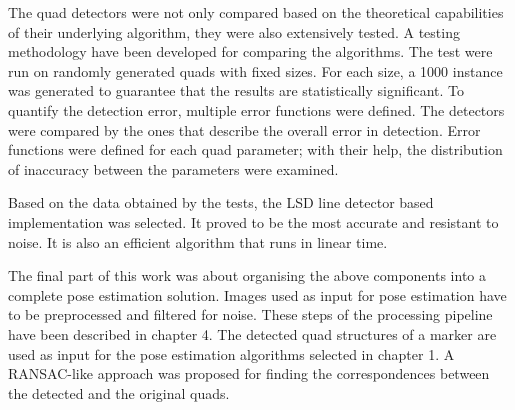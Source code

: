 The quad detectors were not only compared based on the theoretical capabilities of their underlying algorithm, they were also extensively tested.
A testing methodology have been developed for comparing the algorithms.
The test were run on randomly generated quads with fixed sizes.
For each size, a 1000 instance was generated to guarantee that the results are statistically significant.
To quantify the detection error, multiple error functions were defined.
The detectors were compared by the ones that describe the overall error in detection.
Error functions were defined for each quad parameter; with their help, the distribution of inaccuracy between the parameters were examined.

Based on the data obtained by the tests, the LSD\cite{LSDDet} line detector based implementation was selected.
It proved to be the most accurate and resistant to noise.
It is also an efficient algorithm that runs in linear time.

The final part of this work was about organising the above components into a complete pose estimation solution.
Images used as input for pose estimation have to be preprocessed and filtered for noise.
These steps of the processing pipeline have been described in chapter 4.
The detected quad structures of a marker are used as input for the pose estimation algorithms selected in chapter 1.
A RANSAC-like approach was proposed for finding the correspondences between the detected and the original quads.
